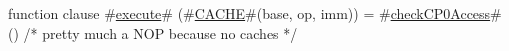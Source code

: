 function clause #\hyperref[zexecute]{execute}# (#\hyperref[zCACHE]{CACHE}#(base, op, imm)) =
  #\hyperref[zcheckCPzeroAccess]{checkCP0Access}# () /* pretty much a NOP because no caches */
